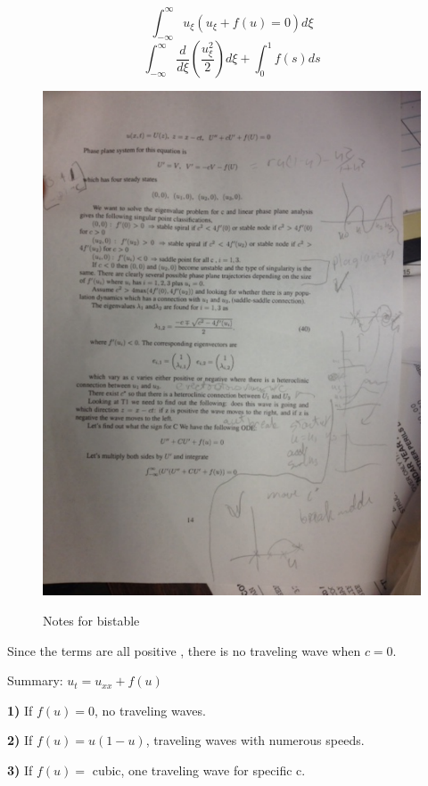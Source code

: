 \documentclass[]{article}
\numberwithin{equation}{section}		%
\begin{document}
\begin{equation}
\int_{-\infty}^{\infty} u_\xi(u_\xi+f(u)=0)d\xi \nonumber
\end{equation}
\begin{equation}
\int_{-\infty}^{\infty} \frac{d}{d\xi}(\frac{u_\xi^2}{2})d\xi+\int_0^1 f(s)ds \nonumber
\end{equation}
\begin{figure}
\caption{Notes for bistable}
\includegraphics[scale=.65]{figures/bistable.pdf}
\label{fig_bist}
\end{figure}

Since the terms are all positive , there is no traveling wave when $c=0$.

Summary: $u_t=u_{xx}+f(u)$

{\bf 1)} If $f(u)=0$, no traveling waves.

{\bf 2)} If  $f(u)=u(1-u)$, traveling waves with numerous speeds.

{\bf 3)} If $f(u)=$ cubic, one traveling wave for specific c.
\end{document}

